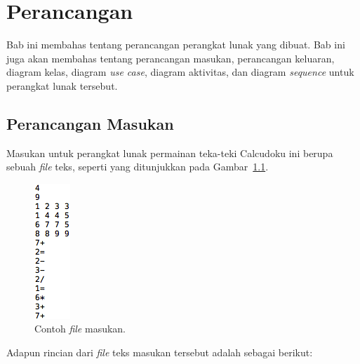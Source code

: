 \chapter{Perancangan}
\label{chap:perancangan}

Bab ini membahas tentang perancangan perangkat lunak yang dibuat. Bab ini juga akan membahas tentang perancangan masukan, perancangan keluaran, diagram kelas, diagram \textit{use case}, diagram aktivitas, dan diagram \textit{sequence} untuk perangkat lunak tersebut.

\section{Perancangan Masukan}
\label{sec:perancanganmasukan}

Masukan untuk perangkat lunak permainan teka-teki Calcudoku ini berupa sebuah \textit{file} teks, seperti yang ditunjukkan pada Gambar~\ref{fig:perancanganmasukan}.

\begin{figure}
\centering
\captionsetup{justification=centering}
\includegraphics[scale=1]{Gambar/Perancangan/PerancanganInput.png}
\caption[Contoh \textit{file} masukan.]{Contoh \textit{file} masukan.}
\label{fig:perancanganmasukan}
\end{figure}

Adapun rincian dari \textit{file} teks masukan tersebut adalah sebagai berikut:

